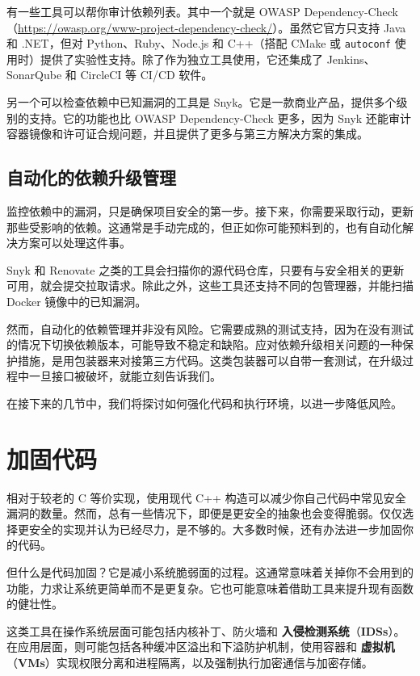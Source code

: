 \label{idx:1056}
\label{idx:1057}
有一些工具可以帮你审计依赖列表。其中一个就是 OWASP Dependency-Check（\href{https://owasp.org/www-project-dependency-check/}{https://owasp.org/www-project-dependency-check/}）。虽然它官方只支持 Java 和 .NET，但对 Python、Ruby、Node.js 和 C++（搭配 CMake 或 \texttt{autoconf} 使用时）提供了实验性支持。除了作为独立工具使用，它还集成了 Jenkins、SonarQube 和 CircleCI 等 CI/CD 软件。

另一个可以检查依赖中已知漏洞的工具是 Snyk。它是一款商业产品，提供多个级别的支持。它的功能也比 OWASP Dependency-Check 更多，因为 Snyk 还能审计容器镜像和许可证合规问题，并且提供了更多与第三方解决方案的集成。

\subsection{自动化的依赖升级管理}

\label{idx:1058}
监控依赖中的漏洞，只是确保项目安全的第一步。接下来，你需要采取行动，更新那些受影响的依赖。这通常是手动完成的，但正如你可能预料到的，也有自动化解决方案可以处理这件事。

Snyk 和 Renovate 之类的工具会扫描你的源代码仓库，只要有与安全相关的更新可用，就会提交拉取请求。除此之外，这些工具还支持不同的包管理器，并能扫描 Docker 镜像中的已知漏洞。

\label{idx:1059}
然而，自动化的依赖管理并非没有风险。它需要成熟的测试支持，因为在没有测试的情况下切换依赖版本，可能导致不稳定和缺陷。应对依赖升级相关问题的一种保护措施，是用包装器来对接第三方代码。这类包装器可以自带一套测试，在升级过程中一旦接口被破坏，就能立刻告诉我们。

在接下来的几节中，我们将探讨如何强化代码和执行环境，以进一步降低风险。

\section{加固代码}

相对于较老的 C 等价实现，使用现代 C++ 构造可以减少你自己代码中常见安全漏洞的数量。然而，总有一些情况下，即便是更安全的抽象也会变得脆弱。仅仅选择更安全的实现并认为已经尽力，是不够的。大多数时候，还有办法进一步加固你的代码。

\label{idx:1060}
但什么是代码加固？它是减小系统脆弱面的过程。这通常意味着关掉你不会用到的功能，力求让系统更简单而不是更复杂。它也可能意味着借助工具来提升现有函数的健壮性。

\label{idx:1061}
\label{idx:1062}
这类工具在操作系统层面可能包括内核补丁、防火墙和 \textbf{入侵检测系统}（\textbf{IDSs}）。在应用层面，则可能包括各种缓冲区溢出和下溢防护机制，使用容器和 \textbf{虚拟机}（\textbf{VMs}）实现权限分离和进程隔离，以及强制执行加密通信与加密存储。

